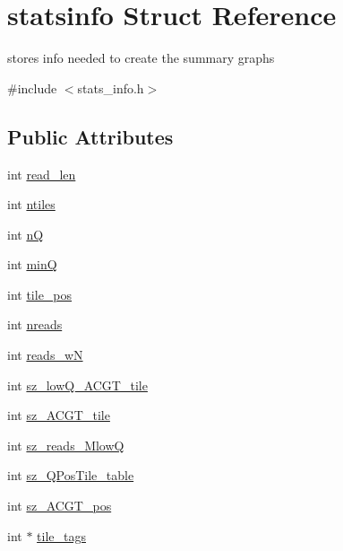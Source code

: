 \hypertarget{structstatsinfo}{}\section{statsinfo Struct Reference}
\label{structstatsinfo}


stores info needed to create the summary graphs  




{\ttfamily \#include $<$stats\+\_\+info.\+h$>$}

\subsection*{Public Attributes}
\begin{DoxyCompactItemize}
\item 
int \mbox{\hyperlink{structstatsinfo_a90c9a180632378e22ab9b0358daf3f0d}{read\+\_\+len}}
\item 
int \mbox{\hyperlink{structstatsinfo_abcfe8e12737ac99b724d4d4407204ec8}{ntiles}}
\item 
int \mbox{\hyperlink{structstatsinfo_a8f99f5ac1c3643e6ad59f124c11676e2}{nQ}}
\item 
int \mbox{\hyperlink{structstatsinfo_a6b33794a27827b8e2ea2b45a95f937d9}{minQ}}
\item 
int \mbox{\hyperlink{structstatsinfo_a740378fa01d92f6e0b2c50a26889fefd}{tile\+\_\+pos}}
\item 
int \mbox{\hyperlink{structstatsinfo_a2f01e91b444793507cb4173582e215bb}{nreads}}
\item 
int \mbox{\hyperlink{structstatsinfo_a14bb0b9848f2301718833bd2130683b7}{reads\+\_\+wN}}
\item 
int \mbox{\hyperlink{structstatsinfo_ae3c83d12e46748f3a0de4628b5e48068}{sz\+\_\+low\+Q\+\_\+\+A\+C\+G\+T\+\_\+tile}}
\item 
int \mbox{\hyperlink{structstatsinfo_a4e1223289cbb8f609d522747d4b47b54}{sz\+\_\+\+A\+C\+G\+T\+\_\+tile}}
\item 
int \mbox{\hyperlink{structstatsinfo_a5f0e812f7a2213cb57a79c8110b7a02e}{sz\+\_\+reads\+\_\+\+MlowQ}}
\item 
int \mbox{\hyperlink{structstatsinfo_aceed3737e42259fa6e7438dc185e587f}{sz\+\_\+\+Q\+Pos\+Tile\+\_\+table}}
\item 
int \mbox{\hyperlink{structstatsinfo_ae95899480cc574a09163190663dd504a}{sz\+\_\+\+A\+C\+G\+T\+\_\+pos}}
\item 
int $\ast$ \mbox{\hyperlink{structstatsinfo_a25f475c79fa4d5aa1255b8c543d8a731}{tile\+\_\+tags}}

\end{DoxyCompactItemize}
